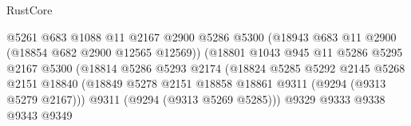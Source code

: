 \begin{lexlean}{RustCore}
\begin{coremodule}
                                              @5261
                                              @683
                                              @1088
                                              @11
                                              @2167
                                              @2900
                                              @5286
                                              @5300
                                              (@18943
                                                @683
                                                @11
                                                @2900
                                                (@18854 @682 @2900 @12565 @12569))
                                              (@18801
                                                @1043
                                                @945
                                                @11
                                                @5286
                                                @5295
                                                @2167
                                                @5300
                                                (@18814
                                                  @5286
                                                  @5293
                                                  @2174
                                                  (@18824
                                                    @5285
                                                    @5292
                                                    @2145
                                                    @5268
                                                    @2151
                                                    @18840
                                                    (@18849
                                                      @5278
                                                      @2151
                                                      @18858
                                                      @18861
                                                      @9311
                                                      (@9294 (@9313 @5279 @2167)))
                                                    @9311
                                                    (@9294 (@9313 @5269 @5285)))
                                                  @9329
                                                  @9333
                                                  @9338
                                                  @9343
                                                  @9349

\end{coremodule}
\end{lexlean}
